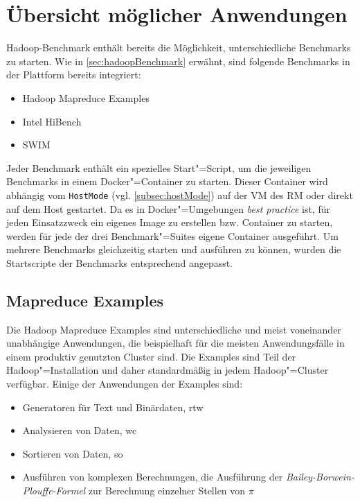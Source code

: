 \section{Übersicht möglicher Anwendungen}
\label{sec:appOverview}

Hadoop-Benchmark enthält bereits die Möglichkeit, unterschiedliche Benchmarks zu starten.
Wie in \cref{sec:hadoopBenchmark} erwähnt, sind folgende Benchmarks in der Plattform bereits integriert:

\begin{itemize}
    \item Hadoop Mapreduce Examples
    \item Intel HiBench
    \item \ac{SWIM}
\end{itemize}

Jeder Benchmark enthält ein spezielles Start"=Script, um die jeweiligen Benchmarks in einem Docker"=Container zu starten.
Dieser Container wird abhängig vom \texttt{HostMode} (vgl. \cref{subsec:hostMode}) auf der VM des \ac{RM} oder direkt auf dem Host gestartet.
Da es in Docker"=Umgebungen \emph{best practice} ist, für jeden Einsatzzweck ein eigenes Image zu erstellen bzw. Container zu starten, werden für jede der drei Benchmark"=Suites eigene Container ausgeführt.
Um mehrere Benchmarks gleichzeitig starten und ausführen zu können, wurden die Startscripte der Benchmarks entsprechend angepasst.

\subsection{Mapreduce Examples}
\label{subsec:mapreduceExamples}

Die Hadoop Mapreduce Examples sind unterschiedliche und meist voneinander unabhängige Anwendungen, die beispielhaft für die meisten Anwendungsfälle in einem produktiv genutzten Cluster sind.
Die Examples sind Teil der Hadoop"=Installation und daher standardmäßig in jedem Hadoop"=Cluster verfügbar.
Einige der Anwendungen der Examples sind:

\begin{itemize}
    \item Generatoren für Text und Binärdaten, \zB \acl{rtw}
    \item Analysieren von Daten, \zB \acl{wc}
    \item Sortieren von Daten, \zB \acl{so}
    \item Ausführen von komplexen Berechnungen, \zB die Ausführung der \emph{Bailey-Borwein-Plouffe-Formel} zur Berechnung einzelner Stellen von $\pi$
\end{itemize}

